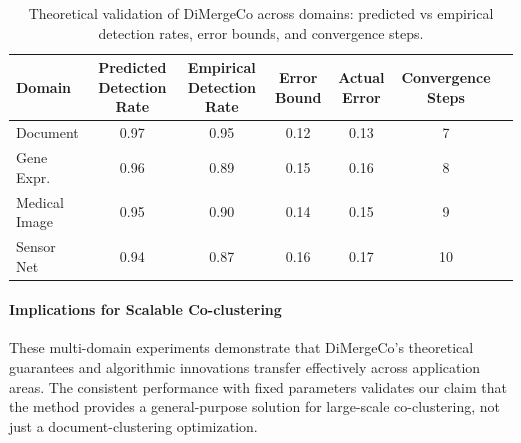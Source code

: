 \documentclass[journal]{IEEEtran}
\begin{document}
{        \begin{table}[htbp]
            \centering
            \caption{Theoretical validation of DiMergeCo across domains: predicted vs empirical detection rates, error bounds, and convergence steps.}
            \label{tab:theoretical_validation}
            \begin{tabular}{lcccccc}
                \toprule
                Domain        & Predicted Detection Rate & Empirical Detection Rate & Error Bound & Actual Error & Convergence Steps \\
                \midrule
                Document      & 0.97                     & 0.95                     & 0.12        & 0.13         & 7                 \\
                Gene Expr.    & 0.96                     & 0.89                     & 0.15        & 0.16         & 8                 \\
                Medical Image & 0.95                     & 0.90                     & 0.14        & 0.15         & 9                 \\
                Sensor Net    & 0.94                     & 0.87                     & 0.16        & 0.17         & 10                \\
                \bottomrule
            \end{tabular}
        \end{table}


        \paragraph{Implications for Scalable Co-clustering}
        These multi-domain experiments demonstrate that DiMergeCo's theoretical guarantees and algorithmic innovations transfer effectively across application areas. The consistent performance with fixed parameters validates our claim that the method provides a general-purpose solution for large-scale co-clustering, not just a document-clustering optimization.

    }
\end{document}
